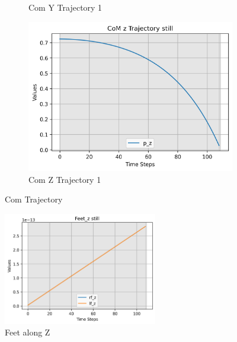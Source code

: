 \documentclass[main.tex]{subfiles}
\begin{document}
\begin{figure}[H]
\begin{subfigure}[b]{0.45\textwidth}
        \caption{Com Y Trajectory 1}
        \label{fig:sub2_still}
    \end{subfigure}
    \hfill
    \begin{subfigure}[b]{0.45\textwidth}
        \centering
        \includegraphics[width=\textwidth]{figures/CoM z Trajectory still.png}
        \caption{Com Z Trajectory 1}
        \label{fig:sub3_still}
    \end{subfigure}
    \caption{Com Trajectory}
    \label{fig:threeimages_still}
\end{figure}

\begin{figure}[htbp]
    \centering
    \includegraphics[width=0.6\textwidth]{figures/Feet_z still.png}
    \caption{Feet along Z}
    \label{fig:feet_still}
\end{figure}
\end{document}
